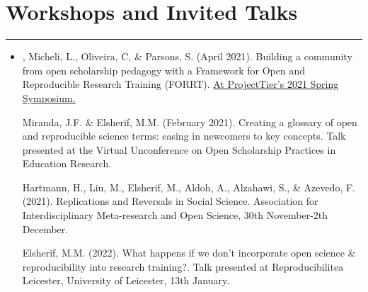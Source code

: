\documentclass[letterpaper]{article}
\begin{document}
\section*{\color{Brown} Workshops and Invited Talks}
\vspace{-.5em}
\hrule
\vspace{1em}
\begin{itemize}


\item[] {, Micheli, L., Oliveira, C, \& Parsons, S. (April 2021). Building a community from open scholarship pedagogy with a Framework for Open and Reproducible Research Training (FORRT).  \href{https://www.projecttier.org/fellowships-and-workshops/2021-spring-symposium/}{\color{BlueViolet}At ProjectTier's 2021 Spring Symposium.}}

Miranda, J.F. \& Elsherif, M.M. (February 2021). Creating a glossary of open and reproducible science terms: easing in newcomers to key concepts. Talk presented at the Virtual Unconference on Open Scholarship Practices in Education Research.

Hartmann, H., Liu, M., Elsherif, M., Aldoh, A., Alzahawi, S., \& Azevedo, F. (2021). Replications and Reversals in Social Science. Association for Interdisciplinary Meta-research and Open Science, 30th November-2th December.

Elsherif, M.M. (2022). What happens if we don’t incorporate open science \& reproducibility into research training?. Talk presented at Reproducibilitea Leicester, University of Leicester, 13th January.

\end{itemize}
\end{document}
